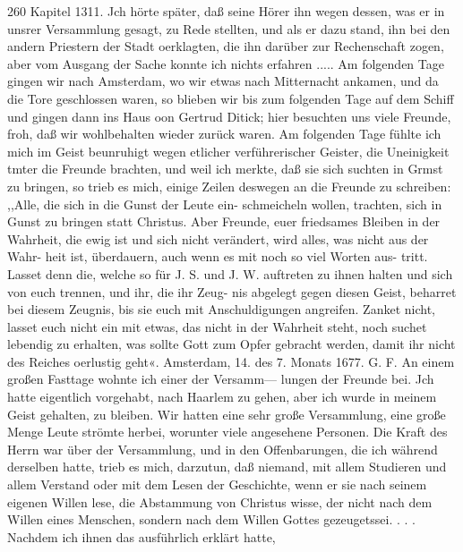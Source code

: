 260 Kapitel 1311.
Jch hörte später, daß seine Hörer ihn wegen dessen, was er
in unsrer Versammlung gesagt, zu Rede stellten, und als er dazu
stand, ihn bei den andern Priestern der Stadt oerklagten, die ihn
darüber zur Rechenschaft zogen, aber vom Ausgang der Sache
konnte ich nichts erfahren .....
Am folgenden Tage gingen wir nach Amsterdam, wo wir
etwas nach Mitternacht ankamen, und da die Tore geschlossen
waren, so blieben wir bis zum folgenden Tage auf dem Schiff
und gingen dann ins Haus oon Gertrud Ditick; hier besuchten
uns viele Freunde, froh, daß wir wohlbehalten wieder zurück
waren. Am folgenden Tage fühlte ich mich im Geist beunruhigt
wegen etlicher verführerischer Geister, die Uneinigkeit tmter die
Freunde brachten, und weil ich merkte, daß sie sich suchten in Grmst
zu bringen, so trieb es mich, einige Zeilen deswegen an die
Freunde zu schreiben: ,,Alle, die sich in die Gunst der Leute ein-
schmeicheln wollen, trachten, sich in Gunst zu bringen statt Christus.
Aber Freunde, euer friedsames Bleiben in der Wahrheit, die ewig
ist und sich nicht verändert, wird alles, was nicht aus der Wahr-
heit ist, überdauern, auch wenn es mit noch so viel Worten aus-
tritt. Lasset denn die, welche so für J. S. und J. W. auftreten
zu ihnen halten und sich von euch trennen, und ihr, die ihr Zeug-
nis abgelegt gegen diesen Geist, beharret bei diesem Zeugnis, bis
sie euch mit Anschuldigungen angreifen. Zanket nicht, lasset euch
nicht ein mit etwas, das nicht in der Wahrheit steht, noch suchet
lebendig zu erhalten, was sollte Gott zum Opfer gebracht werden,
damit ihr nicht des Reiches oerlustig geht«.
Amsterdam, 14. des 7. Monats 1677. G. F.
An einem großen Fasttage wohnte ich einer der Versamm—
lungen der Freunde bei. Jch hatte eigentlich vorgehabt, nach
Haarlem zu gehen, aber ich wurde in meinem Geist gehalten, zu
bleiben. Wir hatten eine sehr große Versammlung, eine große
Menge Leute strömte herbei, worunter viele angesehene Personen.
Die Kraft des Herrn war über der Versammlung, und in den
Offenbarungen, die ich während derselben hatte, trieb es mich,
darzutun, daß niemand, mit allem Studieren und allem Verstand
oder mit dem Lesen der Geschichte, wenn er sie nach seinem eigenen
Willen lese, die Abstammung von Christus wisse, der nicht nach
dem Willen eines Menschen, sondern nach dem Willen Gottes
gezeugetssei. . . . Nachdem ich ihnen das ausführlich erklärt hatte,



